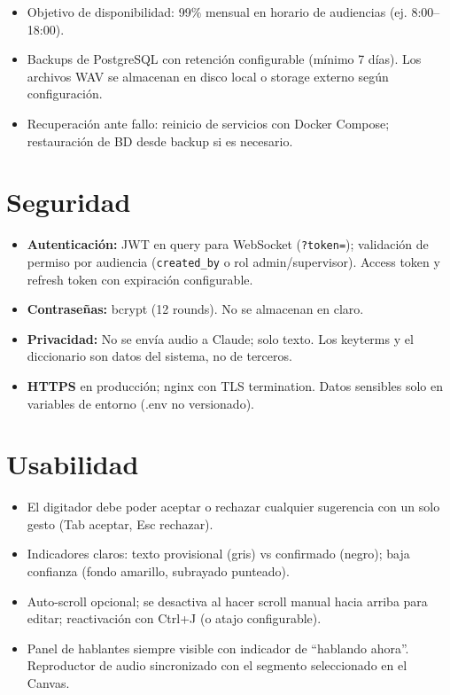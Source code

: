 \documentclass[12pt,a4paper]{report}
\begin{document}
\begin{itemize}
    \item Objetivo de disponibilidad: 99\% mensual en horario de audiencias (ej. 8:00--18:00).
    \item Backups de PostgreSQL con retención configurable (mínimo 7 días). Los archivos WAV se almacenan en disco local o storage externo según configuración.
    \item Recuperación ante fallo: reinicio de servicios con Docker Compose; restauración de BD desde backup si es necesario.
\end{itemize}

\section{Seguridad}

\begin{itemize}
    \item \textbf{Autenticación:} JWT en query para WebSocket (\texttt{?token=}); validación de permiso por audiencia (\texttt{created\_by} o rol admin/supervisor). Access token y refresh token con expiración configurable.
    \item \textbf{Contraseñas:} bcrypt (12 rounds). No se almacenan en claro.
    \item \textbf{Privacidad:} No se envía audio a Claude; solo texto. Los keyterms y el diccionario son datos del sistema, no de terceros.
    \item \textbf{HTTPS} en producción; nginx con TLS termination. Datos sensibles solo en variables de entorno (.env no versionado).
\end{itemize}

\section{Usabilidad}

\begin{itemize}
    \item El digitador debe poder aceptar o rechazar cualquier sugerencia con un solo gesto (Tab aceptar, Esc rechazar).
    \item Indicadores claros: texto provisional (gris) vs confirmado (negro); baja confianza (fondo amarillo, subrayado punteado).
    \item Auto-scroll opcional; se desactiva al hacer scroll manual hacia arriba para editar; reactivación con Ctrl+J (o atajo configurable).
    \item Panel de hablantes siempre visible con indicador de ``hablando ahora''. Reproductor de audio sincronizado con el segmento seleccionado en el Canvas.
\end{itemize}
\end{document}
